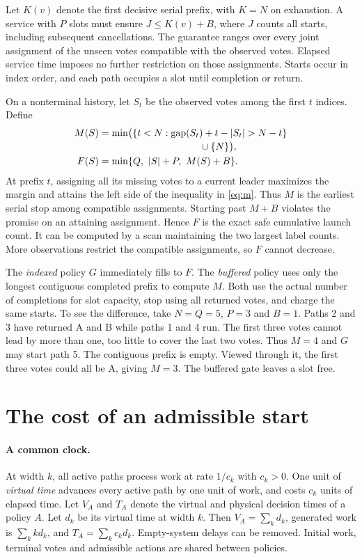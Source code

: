 \documentclass{article}
\newcommand{\gap}{\operatorname{gap}}
\begin{document}
Let \(K(v)\) denote the first decisive serial prefix, with \(K=N\) on exhaustion. A service with \(P\) slots must ensure \(J\le K(v)+B\), where \(J\) counts all starts, including subsequent cancellations. The guarantee ranges over every joint assignment of the unseen votes compatible with the observed votes. Elapsed service time imposes no further restriction on those assignments. Starts occur in index order, and each path occupies a slot until completion or return.

On a nonterminal history, let \(S_t\) be the observed votes among the first \(t\) indices. Define
\begin{align}
 M(S)&=\min\bigl(\{t<N:\gap(S_t)+t-|S_t|>N-t\}\nonumber\\[-2pt]
     &\hspace{3.65cm}\cup\{N\}\bigr),\label{eq:m}\\
 F(S)&=\min\{Q,\ |S|+P,\ M(S)+B\}.\label{eq:f}
\end{align}
At prefix \(t\), assigning all its missing votes to a current leader maximizes the margin and attains the left side of the inequality in \eqref{eq:m}. Thus \(M\) is the earliest serial stop among compatible assignments. Starting past \(M+B\) violates the promise on an attaining assignment. Hence \(F\) is the exact safe cumulative launch count. It can be computed by a scan maintaining the two largest label counts. More observations restrict the compatible assignments, so \(F\) cannot decrease.

The \emph{indexed} policy \(G\) immediately fills to \(F\). The \emph{buffered} policy uses only the longest contiguous completed prefix to compute \(M\). Both use the actual number of completions for slot capacity, stop using all returned votes, and charge the same starts. To see the difference, take \(N=Q=5\), \(P=3\) and \(B=1\). Paths 2 and 3 have returned A and B while paths 1 and 4 run. The first three votes cannot lead by more than one, too little to cover the last two votes. Thus \(M=4\) and \(G\) may start path 5. The contiguous prefix is empty. Viewed through it, the first three votes could all be A, giving \(M=3\). The buffered gate leaves a slot free.

\section{The cost of an admissible start}
\paragraph{A common clock.}
At width \(k\), all active paths process work at rate \(1/c_k\) with \(c_k>0\). One unit of \emph{virtual time} advances every active path by one unit of work, and costs \(c_k\) units of elapsed time. Let \(V_A\) and \(T_A\) denote the virtual and physical decision times of a policy \(A\). Let \(d_k\) be its virtual time at width \(k\). Then \(V_A=\sum_k d_k\), generated work is \(\sum_k k d_k\), and \(T_A=\sum_k c_kd_k\). Empty-system delays can be removed. Initial work, terminal votes and admissible actions are shared between policies.
\end{document}
